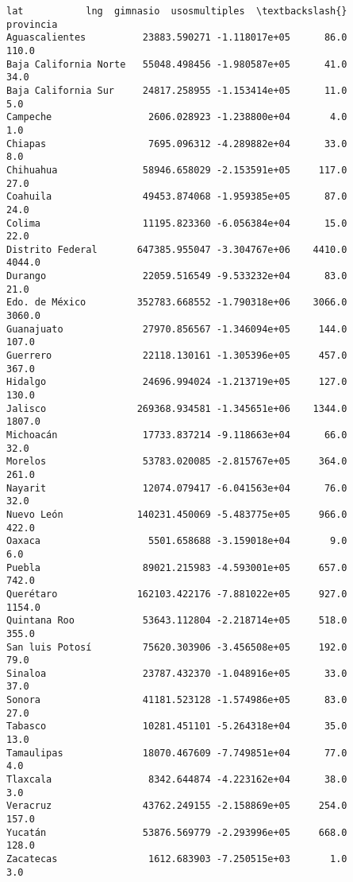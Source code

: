 \documentclass[11pt]{article}
\begin{document}
\begin{tcolorbox}[breakable, boxrule=.5pt, size=fbox, pad at break*=1mm, opacityfill=0]
\begin{Verbatim}[commandchars=\\\{\}]
                                 lat           lng  gimnasio  usosmultiples  \textbackslash{}
provincia
Aguascalientes          23883.590271 -1.118017e+05      86.0          110.0
Baja California Norte   55048.498456 -1.980587e+05      41.0           34.0
Baja California Sur     24817.258955 -1.153414e+05      11.0            5.0
Campeche                 2606.028923 -1.238800e+04       4.0            1.0
Chiapas                  7695.096312 -4.289882e+04      33.0            8.0
Chihuahua               58946.658029 -2.153591e+05     117.0           27.0
Coahuila                49453.874068 -1.959385e+05      87.0           24.0
Colima                  11195.823360 -6.056384e+04      15.0           22.0
Distrito Federal       647385.955047 -3.304767e+06    4410.0         4044.0
Durango                 22059.516549 -9.533232e+04      83.0           21.0
Edo. de México         352783.668552 -1.790318e+06    3066.0         3060.0
Guanajuato              27970.856567 -1.346094e+05     144.0          107.0
Guerrero                22118.130161 -1.305396e+05     457.0          367.0
Hidalgo                 24696.994024 -1.213719e+05     127.0          130.0
Jalisco                269368.934581 -1.345651e+06    1344.0         1807.0
Michoacán               17733.837214 -9.118663e+04      66.0           32.0
Morelos                 53783.020085 -2.815767e+05     364.0          261.0
Nayarit                 12074.079417 -6.041563e+04      76.0           32.0
Nuevo León             140231.450069 -5.483775e+05     966.0          422.0
Oaxaca                   5501.658688 -3.159018e+04       9.0            6.0
Puebla                  89021.215983 -4.593001e+05     657.0          742.0
Querétaro              162103.422176 -7.881022e+05     927.0         1154.0
Quintana Roo            53643.112804 -2.218714e+05     518.0          355.0
San luis Potosí         75620.303906 -3.456508e+05     192.0           79.0
Sinaloa                 23787.432370 -1.048916e+05      33.0           37.0
Sonora                  41181.523128 -1.574986e+05      83.0           27.0
Tabasco                 10281.451101 -5.264318e+04      35.0           13.0
Tamaulipas              18070.467609 -7.749851e+04      77.0            4.0
Tlaxcala                 8342.644874 -4.223162e+04      38.0            3.0
Veracruz                43762.249155 -2.158869e+05     254.0          157.0
Yucatán                 53876.569779 -2.293996e+05     668.0          128.0
Zacatecas                1612.683903 -7.250515e+03       1.0            3.0


\end{Verbatim}
\end{tcolorbox}
\end{document}
